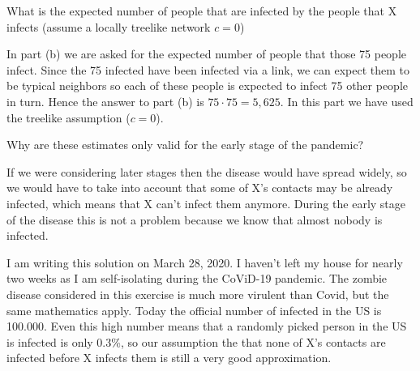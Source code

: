 \subquestion 
What is the expected number of people that are infected by the people that X infects (assume a locally treelike network $c=0$) 

\solution
In part (b) we are asked for the expected number of people that those 75 people infect. Since the 75 infected have been infected via a link, we can expect them to be typical neighbors so each of these people is expected to infect 75 other people in turn. Hence the answer to part (b) is $75\cdot75=5,625$. In this part we have used the treelike assumption ($c=0$).

\subquestion 
Why are these estimates only valid for the early stage of the pandemic?

\solution
If we were considering later stages then the disease would have spread widely, so we would have to take into account that some of X's contacts may be already infected, which means that X can't infect them anymore. During the early stage of the disease this is not a problem because we know that almost nobody is infected. 

I am writing this solution on March 28, 2020. I haven't left my house for nearly two weeks as I am self-isolating during the CoViD-19 pandemic. The zombie disease considered in this exercise is much more virulent than Covid, but the same mathematics apply. Today the official number of infected in the US is 100.000. Even this high number means that a randomly picked person in the US is infected is only 0.3\%, so our assumption the that none of X's contacts are infected before X infects them is still a very good approximation. 
